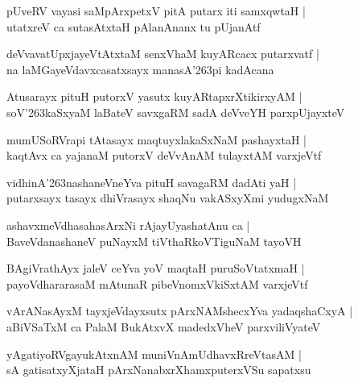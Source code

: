 \documentclass[twoside,12pt,openright]{book}
\def\S{\char'263}
\newcounter{shloka}[chapter]
\begin{document}
\begin{shloka}%
pUveRV vayasi saMpArxpetxV pitA putarx iti samxqwtaH |\\
utatxreV ca sutasAtxtaH pAlanAnanx tu pUjanAtf
\end{shloka}

\begin{shloka}%
deVvavatUpxjayeVtAtxtaM senxVhaM kuyARcacx putarxvatf |\\
na laMGayeVdavxcasatxsayx manasA\S pi kadAcana
\end{shloka}

\begin{shloka}%
Atusarayx pituH putorxV yasutx kuyARtapxrXtikirxyAM |\\
soV\S kaSxyaM laBateV savxgaRM sadA deVveYH parxpUjayxteV 
\end{shloka}

\begin{shloka}%
mumUSoRVrapi tAtasayx maqtuyxlakaSxNaM pashayxtaH |\\
kaqtAvx ca yajanaM putorxV deVvAnAM tulayxtAM varxjeVtf
\end{shloka}

\begin{shloka}%
vidhinA\S nashaneVneYva pituH savagaRM dadAti yaH |\\
putarxsayx tasayx dhiVrasayx shaqNu vakASxyXmi yudugxNaM 
\end{shloka}

\begin{shloka}%
ashavxmeVdhasahasArxNi rAjayUyashatAnu ca |\\
BaveVdanashaneV puNayxM tiVthaRkoVTiguNaM tayoVH 
\end{shloka}

\begin{shloka}%
BAgiVrathAyx jaleV ceYva yoV maqtaH puruSoVtatxmaH |\\
payoVdhararasaM mAtunaR pibeVnomxVkiSxtAM varxjeVtf
\end{shloka}

\begin{shloka}%
vArANasAyxM tayxjeVdayxsutx pArxNAMshecxYva yadaqshaCxyA |\\
aBiVSaTxM ca PalaM BukAtxvX madedxVheV parxviliVyateV
\end{shloka}

\begin{shloka}%
yAgatiyoRVgayukAtxnAM muniVnAmUdhavxRreVtasAM |\\
sA gatisatxyXjataH pArxNanabxrXhamxputerxVSu sapatxsu
\end{shloka}
\end{document}
